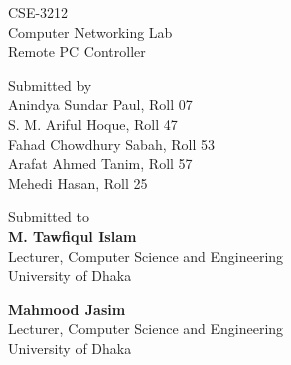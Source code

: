 \documentclass[12pt, a4paper]{article}
\begin{document}
	\begin{titlepage}
		\centering	
		
		\begin{Huge}
			CSE-3212\\
			\vspace{0.5cm}
			Computer Networking Lab\\
			\vspace{0.5cm}
			Remote PC Controller\\
		\end{Huge}

		\vspace{4cm}
		
		\begin{Large}
			Submitted by\\
			Anindya Sundar Paul, Roll 07\\
			S. M. Ariful Hoque, Roll 47\\
			Fahad Chowdhury Sabah, Roll 53\\
			Arafat Ahmed Tanim, Roll 57\\
			Mehedi Hasan, Roll 25\\
		\end{Large}
		
		\vspace{3cm}		
		
		\begin{Large}
			Submitted to\\
		\textbf{	M. Tawfiqul Islam}\\
			Lecturer, Computer Science and Engineering\\
			University of Dhaka\\ 
		\end{Large}
		\begin{Large}		
		\textbf{	Mahmood Jasim}\\
			Lecturer, Computer Science and Engineering\\
			University of Dhaka\\
		\end{Large}
	\end{titlepage}
\end{document}
